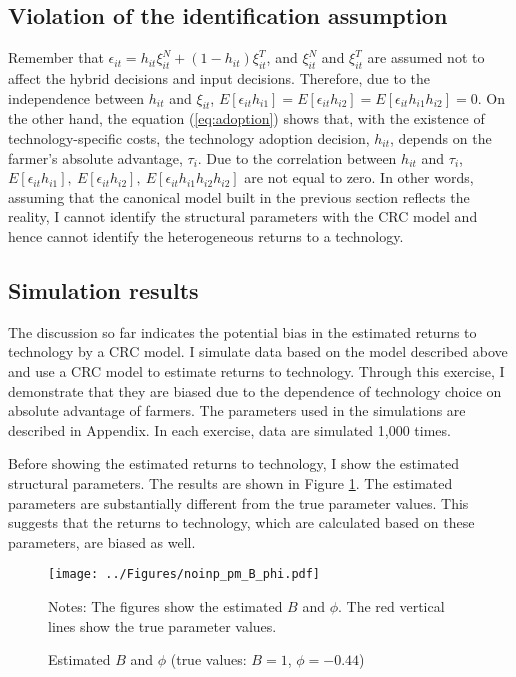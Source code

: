 \documentclass[11pt,letterpaper]{article}
\begin{document}
\subsection{Violation of the identification assumption}

Remember that $\epsilon_{it} = h_{it} \xi_{it}^N + (1 - h_{it}) \xi_{it}^T$, and $\xi_{it}^N$ and $\xi_{it}^T$ are assumed not to affect the hybrid decisions and input decisions.
Therefore, due to the independence between $h_{it}$ and $\xi_{it}$, $E[\epsilon_{it} h_{i1}] = E[\epsilon_{it} h_{i2}] = E[\epsilon_{it} h_{i1} h_{i2}] = 0$.
On the other hand, the equation (\ref{eq:adoption}) shows that, with the existence of technology-specific costs, the technology adoption decision, $h_{it}$, depends on the farmer's absolute advantage, $\tau_i$.
Due to the correlation between $h_{it}$ and $\tau_i$, $E[\epsilon_{it} h_{i1}], \ E[\epsilon_{it} h_{i2}], \ E[\epsilon_{it} h_{i1} h_{i2} h_{i2}]$ are not equal to zero.
In other words, assuming that the canonical model built in the previous section reflects the reality, I cannot identify the structural parameters with the CRC model and hence cannot identify the heterogeneous returns to a technology.

\subsection{Simulation results}\label{sec:sim_1}

The discussion so far indicates the potential bias in the estimated returns to technology by a CRC model.
I simulate data based on the model described above and use a CRC model to estimate returns to technology.
Through this exercise, I demonstrate that they are biased due to the dependence of technology choice on absolute advantage of farmers.
The parameters used in the simulations are described in Appendix.
In each exercise, data are simulated 1,000 times.

Before showing the estimated returns to technology, I show the estimated structural parameters.
The results are shown in Figure \ref{fig:noinp_pm_B_phi}.
The estimated parameters are substantially different from the true parameter values.
This suggests that the returns to technology, which are calculated based on these parameters, are biased as well.

\begin{figure}[H]
  \centering
  \caption{Estimated $B$ and $\phi$ (true values: $B = 1$, $\phi = -0.44$)}
  \texttt{[image: ../Figures/noinp\_pm\_B\_phi.pdf]}
  \label{fig:noinp_pm_B_phi}
  \footnotesize
  \begin{tablenotes}
    \item Notes:
      The figures show the estimated $B$ and $\phi$.
      The red vertical lines show the true parameter values.
  \end{tablenotes}
\end{figure}
\end{document}
